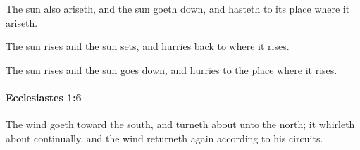 			\begin{versebox}
					\item[BHS] 
					\item[LXX] 
					\item[ASV] The sun also ariseth, and the sun goeth down, and hasteth to its place where it ariseth.
					\item[NIV] The sun rises and the sun sets, and hurries back to where it rises.
					\item[NRSV] The sun rises and the sun goes down, and hurries to the place where it rises.
			\end{versebox}

		\paragraph{Ecclesiastes 1:6} %
			\label{ECCLESIASTES-1-6}

			The wind goeth toward the south, and turneth about unto the north; it whirleth about continually, and the wind returneth again according to his circuits.

